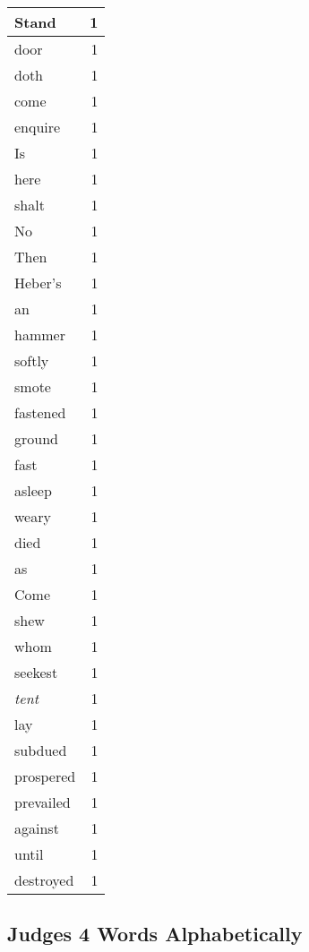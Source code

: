 \begin{center}
\begin{longtable}{l|r}
Stand & 1\\ \hline 
door & 1\\ \hline 
doth & 1\\ \hline 
come & 1\\ \hline 
enquire & 1\\ \hline 
Is & 1\\ \hline 
here & 1\\ \hline 
shalt & 1\\ \hline 
No & 1\\ \hline 
Then & 1\\ \hline 
Heber's & 1\\ \hline 
an & 1\\ \hline 
hammer & 1\\ \hline 
softly & 1\\ \hline 
smote & 1\\ \hline 
fastened & 1\\ \hline 
ground & 1\\ \hline 
fast & 1\\ \hline 
asleep & 1\\ \hline 
weary & 1\\ \hline 
died & 1\\ \hline 
as & 1\\ \hline 
Come & 1\\ \hline 
shew & 1\\ \hline 
whom & 1\\ \hline 
seekest & 1\\ \hline 
\emph{tent} & 1\\ \hline 
lay & 1\\ \hline 
subdued & 1\\ \hline 
prospered & 1\\ \hline 
prevailed & 1\\ \hline 
against & 1\\ \hline 
until & 1\\ \hline 
destroyed & 1\\ \hline 
\end{longtable}
\end{center}





\subsection{Judges 4 Words Alphabetically}


\normalsize
 

